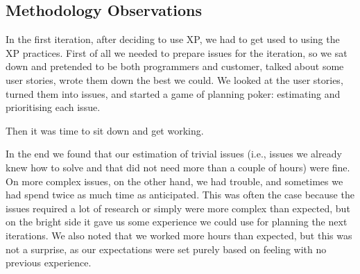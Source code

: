 \subsection{Methodology Observations}\label{sec:release1Methodology}
In the first iteration, after deciding to use XP, we had to get used to using the XP practices. First of all we needed to prepare issues for the iteration, so we sat down and pretended to be both programmers and customer, talked about some user stories, wrote them down the best we could. We looked at the user stories, turned them into issues, and started a game of planning poker: estimating and prioritising each issue.

Then it was time to sit down and get working. 

In the end we found that our estimation of trivial issues (i.e., issues we already knew how to solve and that did not need more than a couple of hours) were fine. On more complex issues, on the other hand, we had trouble, and sometimes we had spend twice as much time as anticipated. This was often the case because the issues required a lot of research or simply were more complex than expected, but on the bright side it gave us some experience we could use for planning the next iterations. We also noted that we worked more hours than expected, but this was not a surprise, as our expectations were set purely based on feeling with no previous experience.


